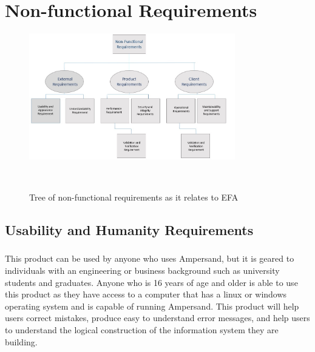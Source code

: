 \documentclass[12pt]{report}
\begin{document}
\chapter{Non-functional Requirements}\label{ch:NonFunc}
\begin{figure}[!htb]
	\centering
	\includegraphics[width=0.8\textwidth]{../figures/NONFUNCTIONAL}
	\caption{Tree of non-functional requirements as it relates to EFA}~\label{fig:figure2}
\end{figure}
\section{Usability and Humanity Requirements}\label{sec:Usability}

\paragraph{}
This product can be used by anyone who uses Ampersand, but it is geared to 
individuals with an engineering or business background such as university 
students and graduates. Anyone who is 16 years of age and older is able to use 
this product as they have access to a computer that has a linux or windows 
operating system and is capable of running Ampersand. This product will help 
users correct mistakes, produce easy to understand error messages, and help 
users to understand the logical construction of the information system they are 
building.\\
\end{document}
